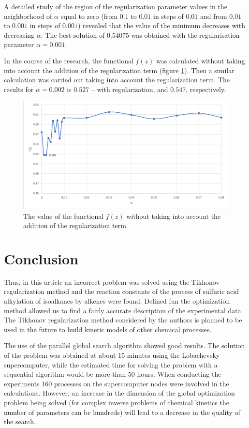 \documentclass{svproc}
\begin{document}
A detailed study of the region of the regularization parameter values in the neighborhood of $\alpha$ equal to zero (from $0.1$ to $0.01$ in steps of $0.01$ and from $0.01$ to $0.001$ in steps of $0.001$) revealed that the value of the minimum decreases with decreasing $\alpha$. The best solution of $0.54075$ was obtained with the regularisation parameter $\alpha = 0.001$.

In the course of the research, the functional $f(z)$ was calculated without taking into account the addition of the regularization term (figure \ref{fig7}). Then a similar calculation was carried out taking into account the regularization term. The results for $\alpha=0.002$ is $0.527$ – with regularization, and $0.547$, respectively.

\begin{figure}
\centering
\includegraphics[height=6.0 cm]{fig7.png}
\caption{The value of the functional $f(z)$ without taking into account the addition of the regularization term}
\label{fig7}
\end{figure}

\section{Conclusion} 

Thus, in this article an incorrect problem was solved using the Tikhonov regularization method and the reaction constants of the process of sulfuric acid alkylation of isoalkanes by alkenes were found. Defined fun the optimization method allowed us to find a fairly accurate description of the experimental data. The Tikhonov regularization method considered by the authors is planned to be used in the future to build kinetic models of other chemical processes.

The use of the parallel global search algorithm showed good results. The solution of the problem was obtained at about 15 minutes using the Lobachevsky supercomputer, while the estimated time for solving the problem with a sequential algorithm would be more than 50 hours. When conducting the experiments 160 processes on the supercomputer nodes were involved in the calculations. However, an increase in the dimension of the global optimization problem being solved (for complex inverse problems of chemical kinetics the number of parameters can be hundreds) will lead to a decrease in the quality of the search.
\end{document}
